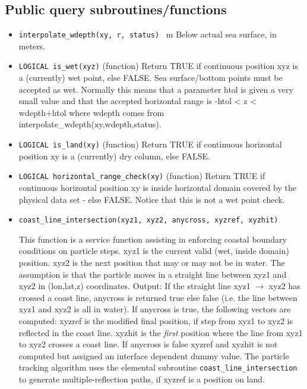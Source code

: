 \subsection{Public query subroutines/functions}

\begin{itemize}

 \item {\tt interpolate\_wdepth(xy, r, status) } m \newline  Below actual sea surface, in meters.    
 
 \item {\tt LOGICAL is\_wet(xyz)} (function) Return TRUE if continuous position 
         xyz is a (currently) wet point,  else FALSE.
         Sea surface/bottom points must be accepted as wet. 
         Normally this means that a parameter htol is given a very small value and that
         the accepted horizontal range is  -htol < z < wdepth+htol
         where wdepth comes from interpolate\_wdepth(xy,wdepth,status).

 \item {\tt LOGICAL is\_land(xy)} (function) Return TRUE if continuous horizontal 
         position xy is a (currently) dry column, else FALSE.

 \item {\tt LOGICAL horizontal\_range\_check(xy)} (function) Return TRUE if continuous horizontal 
        position xy is inside horizontal domain covered by the physical data set - else FALSE.
        Notice that this is not a wet point check.

 
 \item {\tt coast\_line\_intersection(xyz1, xyz2, anycross, xyzref, xyzhit)} 
 
   This function is a service function assisting in enforcing 
   coastal boundary conditions on particle steps. xyz1 is the current 
   valid (wet, inside domain) position. xyz2 is the next position that may or may not be in water.
   The assumption is that the particle moves in a straight line 
   between xyz1 and xyz2 in (lon,lat,z) coordinates.\newline
   Output: If the straight line xyz1 $\rightarrow$ xyz2 has crossed a coast line, 
   anycross is returned true else false (i.e. the line between xyz1 and xyz2 is all in water). 
   If anycross is true, the following vectors are computed:
   xyzref is the modified final position, if step from xyz1 to xyz2 is reflected
   in the coast line. xyzhit is the {\em first} position where the line from xyz1 to xyz2 
   crosses a coast line. 
   If anycross is false xyzref and xyzhit is not computed but assigned an interface
   dependent dummy value. The particle tracking algorithm uses the elemental 
   subroutine {\tt coast\_line\_intersection}
   to generate multiple-reflection paths, if xyzref is a position on land.

\end{itemize}

